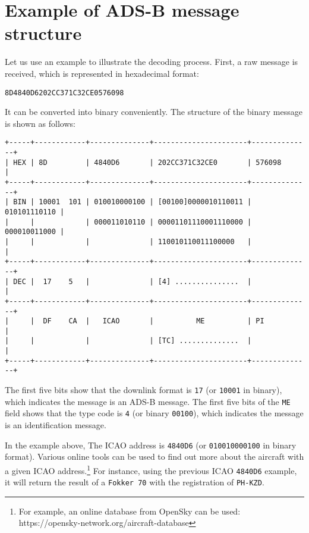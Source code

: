 \section{Example of ADS-B message structure}

Let us use an example to illustrate the decoding process. First, a raw message is received, which is represented in hexadecimal format:

\begin{verbatim}
8D4840D6202CC371C32CE0576098
\end{verbatim}

It can be converted into binary conveniently. The structure of the binary message is shown as follows:

\begin{verbatim}
+-----+------------+--------------+----------------------+--------------+
| HEX | 8D         | 4840D6       | 202CC371C32CE0       | 576098       |
+-----+------------+--------------+----------------------+--------------+
| BIN | 10001  101 | 010010000100 | [00100]0000010110011 | 010101110110 |
|     |            | 000011010110 | 00001101110001110000 | 000010011000 |
|     |            |              | 110010110011100000   |              |
+-----+------------+--------------+----------------------+--------------+
| DEC |  17    5   |              | [4] ...............  |              |
+-----+------------+--------------+----------------------+--------------+
|     |  DF    CA  |   ICAO       |          ME          | PI           |
|     |            |              | [TC] ..............  |              |
+-----+------------+--------------+----------------------+--------------+
\end{verbatim}

The first five bits show that the downlink format is \texttt{17} (or \texttt{10001} in binary), which indicates the message is an ADS-B message. The first five bits of the \texttt{ME} field shows that the type code is \texttt{4} (or binary \texttt{00100}), which indicates the message is an identification message.

In the example above, The ICAO address is \texttt{4840D6} (or \texttt{010010000100} in binary format). Various online tools can be used to find out more about the aircraft with a given ICAO address.\footnote{For example, an online database from OpenSky can be used:\\ https://opensky-network.org/aircraft-database} For instance, using the previous ICAO \texttt{4840D6} example, it will return the result of a \texttt{Fokker\ 70} with the registration of \texttt{PH-KZD}.


